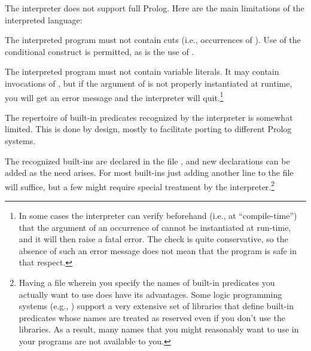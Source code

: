 



The interpreter does not support full Prolog.  Here are the main limitations
of the interpreted language:
\begin{Enumerate}

\item
  The interpreted program must not contain cuts (i.e., occurrences
  of ).  Use of the conditional
  construct is permitted, as is the use of
  .

\item
  The interpreted program must not contain variable literals.  It may contain invocations of , but if the
  argument of  is not properly instantiated at runtime, you will
  get an error message and the interpreter will quit.\footnote{
    In some cases the interpreter can verify beforehand (i.e., at
    ``compile-time'') that the argument of an occurrence of 
    cannot be instantiated at run-time, and it will then raise a fatal error.
    The check is quite conservative, so the absence of such an error message
    does not mean that the program is safe in that respect.}

\item
  The repertoire of built-in predicates recognized
  by the interpreter is somewhat limited.  This is done by design, mostly to
  facilitate porting to different Prolog systems.

  The recognized built-ins are declared in the file ,
  and new declarations can be added as the need arises.  For most built-ins
  just adding another line to the file will suffice, but a few might
  require special treatment by the interpreter.\footnote{
    Having a file wherein you specify the names of built-in predicates you
    actually want to use does have its advantages.  Some logic programming
    systems (e.g., \Eclipse{}) support a very extensive set of libraries that
    define built-in predicates whose names are treated as reserved even if
    you don't use the libraries.  As a result, many names that you might
    reasonably want to use in your programs are not available to you.}
\end{Enumerate}

